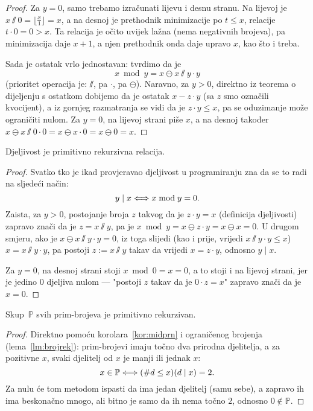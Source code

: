 \begin{proof}
Za $y=0$, samo trebamo izračunati lijevu i desnu stranu. Na lijevoj je $x\sslash 0=\bigl\lfloor\frac{x}{1}\bigr\rfloor=x$, a na desnoj je prethodnik minimizacije po $t\le x$, relacije $t\cdot 0=0>x$. Ta relacija je očito uvijek lažna (nema negativnih brojeva), pa minimizacija daje $x+1$, a njen prethodnik onda daje upravo $x$, kao što i treba.

Sada je ostatak vrlo jednostavan: tvrdimo da je
\begin{equation}
    x\bmod y=x\ominus x\sslash y\cdot y
\end{equation}
(prioritet operacija je: $\sslash$, pa $\cdot$, pa $\ominus$). Naravno, za $y>0$, direktno iz teorema o dijeljenju s ostatkom dobijemo da je ostatak $x-z\cdot y$ (sa $z$ smo označili kvocijent), a iz gornjeg razmatranja se vidi da je $z\cdot y\le x$, pa se oduzimanje može ograničiti nulom. Za $y=0$, na lijevoj strani piše $x$, a na desnoj također $x\ominus x\sslash0\cdot 0=x\ominus x\cdot0=x\ominus0=x$.
\end{proof}

\begin{korolar}\label{kor:midprn}
Djeljivost je primitivno rekurzivna relacija.
\end{korolar}
\begin{proof}
Svatko tko je ikad provjeravao djeljivost u programiranju zna da se to radi na sljedeći način:
\begin{equation}
    y\mid x\Longleftrightarrow x\bmod y=0\text.
\end{equation}
Zaista, za $y>0$, postojanje broja $z$ takvog da je $z\cdot y=x$ (definicija djeljivosti) zapravo znači da je $z=x\sslash y$, pa je $x\bmod y=x\ominus z\cdot y=x\ominus x=0$. U drugom smjeru, ako je $x\ominus x\sslash y\cdot y=0$, iz toga slijedi (kao i prije, vrijedi $x\sslash y\cdot y\le x$) $x=x\sslash y\cdot y$, pa postoji $z:=x\sslash y$ takav da vrijedi $x=z\cdot y$, odnosno $y\mid x$.

Za $y=0$, na desnoj strani stoji $x\bmod 0=x=0$, a to stoji i na lijevoj strani, jer je jedino $0$ djeljiva nulom --- "postoji $z$ takav da je $0\cdot z=x$" zapravo znači da je $x=0$.
\end{proof}

\begin{korolar}
    Skup\, $\mathbb P$ svih prim-brojeva je primitivno rekurzivan.
\end{korolar}
\begin{proof}
Direktno pomoću korolara~\ref{kor:midprn} i ograničenog brojenja (lema~\ref{lm:brojrek}): prim-brojevi imaju točno dva prirodna djelitelja, a za pozitivne $x$, svaki djelitelj od $x$ je manji ili jednak $x$:
\begin{equation}\label{eq:Pprn}
    x\in\mathbb P\Longleftrightarrow(\#d\le x)(d\mid x)=2\text.
\end{equation}
Za nulu će tom metodom ispasti da ima jedan djelitelj (samu sebe), a zapravo ih ima beskonačno mnogo, ali bitno je samo da ih nema točno $2$, odnosno $0\not\in\mathbb P$.
\end{proof}

